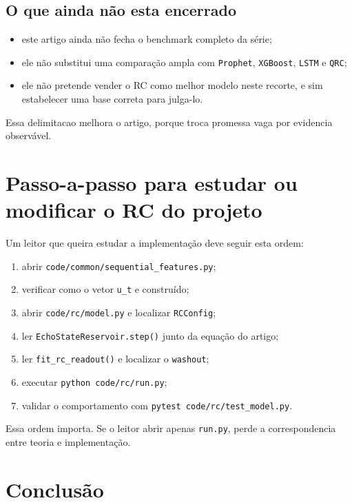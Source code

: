 \documentclass[12pt]{article}
\providecommand{\tightlist}{%
              \setlength{\itemsep}{0pt}\setlength{\parskip}{0pt}}
\begin{document}
\subsection{O que ainda não esta encerrado}\label{142-o-que-ainda-nuxe3o-esta-encerrado}

\begin{itemize}
\tightlist
\item
  este artigo ainda não fecha o benchmark completo da série;
\item
  ele não substitui uma comparação ampla com \texttt{Prophet}, \texttt{XGBoost}, \texttt{LSTM} e \texttt{QRC};
\item
  ele não pretende vender o RC como melhor modelo neste recorte, e sim estabelecer uma base correta para julga-lo.
\end{itemize}

Essa delimitacao melhora o artigo, porque troca promessa vaga por evidencia observável.

\section{Passo-a-passo para estudar ou modificar o RC do projeto}\label{15-passo-a-passo-para-estudar-ou-modificar-o-rc-do-projeto}

Um leitor que queira estudar a implementação deve seguir esta ordem:

\begin{enumerate}
\def\labelenumi{\arabic{enumi}.}
\tightlist
\item
  abrir \texttt{code/common/sequential\_features.py};
\item
  verificar como o vetor \texttt{u\_t} e construído;
\item
  abrir \texttt{code/rc/model.py} e localizar \texttt{RCConfig};
\item
  ler \texttt{EchoStateReservoir.step()} junto da equação do artigo;
\item
  ler \texttt{fit\_rc\_readout()} e localizar o \texttt{washout};
\item
  executar \texttt{python\ code/rc/run.py};
\item
  validar o comportamento com \texttt{pytest\ code/rc/test\_model.py}.
\end{enumerate}

Essa ordem importa. Se o leitor abrir apenas \texttt{run.py}, perde a correspondencia entre teoria e implementação.

\section{Conclusão}\label{16-conclusuxe3o}
\end{document}
